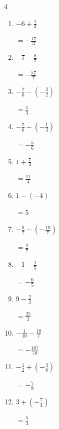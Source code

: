 \begin{multicols}{4}
\begin{enumerate}
        $\displaystyle =-\frac{15}{28}$

  \item $\displaystyle -6 + \frac{1}{3}$

        $\displaystyle =-\frac{17}{3}$

  \item $\displaystyle -7 - \frac{8}{7}$

        $\displaystyle =-\frac{57}{7}$

  \item $\displaystyle -\frac{7}{6} - \left(-\frac{3}{2}\right)$

        $\displaystyle =\frac{1}{3}$

  \item $\displaystyle -\frac{7}{6} - \left(-\frac{1}{3}\right)$

        $\displaystyle =-\frac{5}{6}$

  \item $\displaystyle 1 + \frac{7}{4}$

        $\displaystyle =\frac{11}{4}$

  \item $\displaystyle 1 - \left(-4\right)$

        $\displaystyle =5$

\columnbreak %

  \item $\displaystyle -\frac{8}{7} - \left(-\frac{10}{7}\right)$

        $\displaystyle =\frac{2}{7}$

  \item $\displaystyle -1 - \frac{1}{5}$

        $\displaystyle =-\frac{6}{5}$

  \item $\displaystyle 9 - \frac{2}{3}$

        $\displaystyle =\frac{25}{3}$

  \item $\displaystyle -\frac{1}{10} - \frac{10}{7}$

        $\displaystyle =-\frac{107}{70}$

  \item $\displaystyle -\frac{1}{2} + \left(-\frac{3}{8}\right)$

        $\displaystyle =-\frac{7}{8}$

  \item $\displaystyle 3 + \left(-\frac{7}{4}\right)$

        $\displaystyle =\frac{5}{4}$


\end{enumerate}
\end{multicols}
